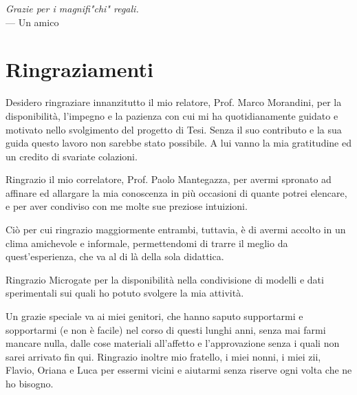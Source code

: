 

\begin{flushright}{\slshape    
	Grazie per i magnifi"chi" regali.} \\ \medskip
	--- Un amico\end{flushright}

\bigskip

\begingroup
\let\clearpage\relax
\let\cleardoublepage\relax
\let\cleardoublepage\relax

\chapter*{Ringraziamenti}


Desidero ringraziare innanzitutto il mio relatore, Prof. Marco Morandini, per la disponibilità, l'impegno e la pazienza con cui mi ha quotidianamente guidato e motivato nello svolgimento del progetto di Tesi. Senza il suo contributo e la sua guida questo lavoro non sarebbe stato possibile. A lui vanno la mia gratitudine ed un credito di svariate colazioni.

Ringrazio il mio correlatore, Prof. Paolo Mantegazza, per avermi spronato ad affinare ed allargare la mia conoscenza in più occasioni di quante potrei elencare, e per aver condiviso con me molte sue preziose intuizioni.

Ciò per cui ringrazio maggiormente entrambi, tuttavia, è di avermi accolto in un clima amichevole e informale, permettendomi di trarre il meglio da quest'esperienza, che va al di là della sola didattica.

Ringrazio Microgate per la disponibilità nella condivisione di modelli e dati sperimentali sui quali ho potuto svolgere la mia attività. 

Un grazie speciale va ai miei genitori, che hanno saputo supportarmi e sopportarmi (e non è facile) nel corso di questi lunghi anni, senza mai farmi mancare nulla, dalle cose materiali all'affetto e l'approvazione senza i  quali non sarei arrivato fin qui. Ringrazio inoltre mio fratello, i miei nonni, i miei zii, Flavio, Oriana e Luca per essermi vicini e aiutarmi senza riserve ogni volta che ne ho bisogno.

